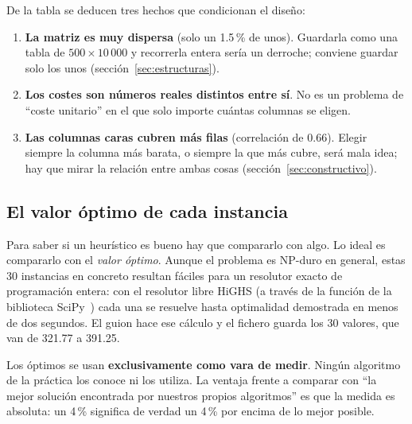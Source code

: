 De la tabla se deducen tres hechos que condicionan el diseño:
\begin{enumerate}
  \item \textbf{La matriz es muy dispersa} (solo un 1.5\,\% de unos). Guardarla como una
        tabla de $500\times 10\,000$ y recorrerla entera sería un derroche; conviene guardar
        solo los unos (sección~\ref{sec:estructuras}).
  \item \textbf{Los costes son números reales distintos entre sí}. No es un problema de
        ``coste unitario'' en el que solo importe cuántas columnas se eligen.
  \item \textbf{Las columnas caras cubren más filas} (correlación de 0.66). Elegir siempre la
        columna más barata, o siempre la que más cubre, será mala idea; hay que mirar la
        relación entre ambas cosas (sección~\ref{sec:constructivo}).
\end{enumerate}

\subsection{El valor óptimo de cada instancia}\label{sec:optimos}

Para saber si un heurístico es bueno hay que compararlo con algo. Lo ideal es compararlo con
el \emph{valor óptimo}. Aunque el problema es NP-duro en general, estas 30 instancias en
concreto resultan fáciles para un resolutor exacto de programación entera: con el resolutor
libre HiGHS (a través de la función  de la biblioteca SciPy~\cite{scipymilp}) cada
una se resuelve hasta optimalidad demostrada en menos de dos segundos. El guion
 hace ese cálculo y el fichero
 guarda los 30 valores, que van de 321.77 a 391.25.

\begin{decision}
Los óptimos se usan \textbf{exclusivamente como vara de medir}. Ningún algoritmo de la
práctica los conoce ni los utiliza. La ventaja frente a comparar con ``la mejor solución
encontrada por nuestros propios algoritmos'' es que la medida es absoluta: un 4\,\% significa
de verdad un 4\,\% por encima de lo mejor posible.
\end{decision}

